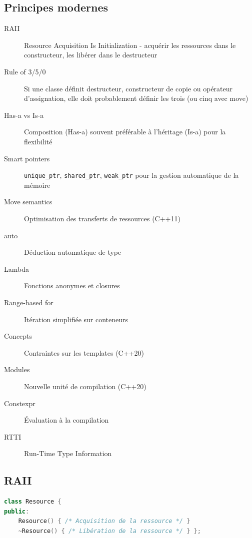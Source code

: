\documentclass{article}
\begin{document}
\begin{multicols*}{3}
\section*{Principes modernes}
\begin{description}
\item[RAII] Resource Acquisition Is Initialization - acquérir les ressources dans le constructeur, les libérer dans le destructeur
\item[Rule of 3/5/0] Si une classe définit destructeur, constructeur de copie ou opérateur d'assignation, elle doit probablement définir les trois (ou cinq avec move)
\item[Has-a vs Is-a] Composition (Has-a) souvent préférable à l'héritage (Is-a) pour la flexibilité
\item[Smart pointers] \texttt{unique\_ptr}, \texttt{shared\_ptr}, \texttt{weak\_ptr} pour la gestion automatique de la mémoire
\item[Move semantics] Optimisation des transferts de ressources (C++11)
\item[auto] Déduction automatique de type
\item[Lambda] Fonctions anonymes et closures
\item[Range-based for] Itération simplifiée sur conteneurs
\item[Concepts] Contraintes sur les templates (C++20)
\item[Modules] Nouvelle unité de compilation (C++20)
\item[Constexpr] Évaluation à la compilation
\item[RTTI] Run-Time Type Information
\end{description}

\subsection*{RAII}

\begin{lstlisting}[language=C++]
class Resource {
public:
    Resource() { /* Acquisition de la ressource */ }
    ~Resource() { /* Libération de la ressource */ } };
\end{lstlisting}


\end{multicols*}
\end{document}
